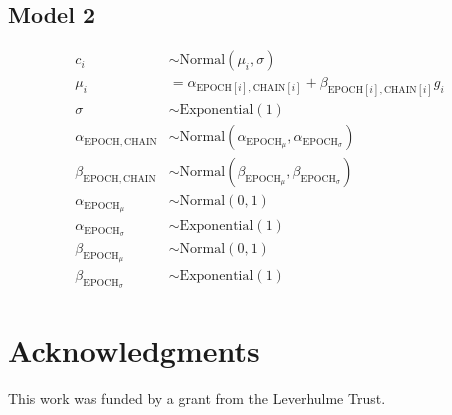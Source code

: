 \documentclass[doc,biblatex]{apa7}
\begin{document}
\subsection{Model 2}

	\begin{align*}
	   c_i                                 & \sim \mathrm{Normal}(\mu_i, \sigma) \\
	 \mu_i                                 & = \alpha_{\mathrm{EPOCH}[i],\mathrm{CHAIN}[i]} + \beta_{\mathrm{EPOCH}[i],\mathrm{CHAIN}[i]} g_i \\
	\sigma                                 & \sim \mathrm{Exponential}(1) \\
	\alpha_{\mathrm{EPOCH},\mathrm{CHAIN}} & \sim \mathrm{Normal}(\alpha_{\mathrm{EPOCH}_\mu}, \alpha_{\mathrm{EPOCH}_\sigma}) \\
	\beta_{\mathrm{EPOCH},\mathrm{CHAIN}}  & \sim \mathrm{Normal}(\beta_{\mathrm{EPOCH}_\mu}, \beta_{\mathrm{EPOCH}_\sigma}) \\
	\alpha_{\mathrm{EPOCH}_\mu}            & \sim \mathrm{Normal}(0, 1) \\
	\alpha_{\mathrm{EPOCH}_\sigma}         & \sim \mathrm{Exponential}(1) \\
	\beta_{\mathrm{EPOCH}_\mu}             & \sim \mathrm{Normal}(0, 1) \\
	\beta_{\mathrm{EPOCH}_\sigma}          & \sim \mathrm{Exponential}(1)
	\end{align*}


\section{Acknowledgments}

\noindent This work was funded by a grant from the Leverhulme Trust.

\printbibliography
\end{document}
